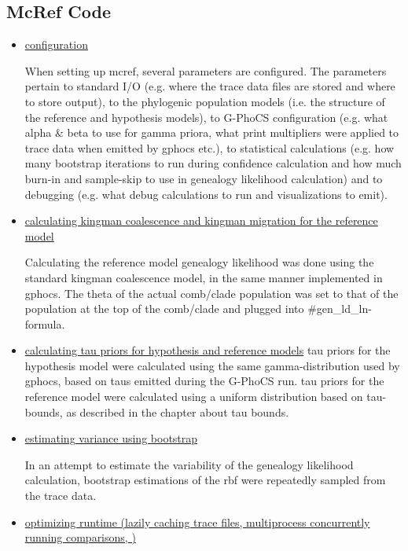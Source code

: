 \documentclass[11pt]{article}
\newcommand{\1}{\mathbbm{1}}
\newcommand{\gp}{G-PhoCS }
\begin{document}
\subsection{McRef Code}

\begin{itemize}
\item \underline{configuration}

When setting up mcref, several parameters are configured. The parameters pertain to standard I/O (e.g. where the trace data files are stored and where to store output), to the phylogenic population models (i.e. the structure of the reference and hypothesis models), to \gp configuration (e.g. what alpha \& beta to use for gamma priora, what print multipliers were applied to trace data when emitted by gphocs etc.), to statistical calculations (e.g. how many bootstrap iterations to run during confidence calculation and how much burn-in and sample-skip to use in genealogy likelihood calculation) and to debugging (e.g. what debug calculations to run and visualizations to emit). 

\item \underline{calculating kingman coalescence and kingman migration for the reference model}

Calculating the reference model genealogy likelihood was done using the standard kingman coalescence model, in the same manner implemented in gphocs. The theta of the actual comb/clade population was set to that of the population at the top of the comb/clade and plugged into \#gen\_ld\_ln-formula. 

\item \underline{calculating tau priors for hypothesis and reference models}
tau priors for the hypothesis model were calculated using the same gamma-distribution used by gphocs, based on taus emitted during the \gp run. tau priors for the reference model were calculated using a uniform distribution based on tau-bounds, as described in the chapter about tau bounds.

\item \underline{estimating variance using bootstrap}

In an attempt to estimate the variability of the genealogy likelihood calculation, bootstrap estimations of the rbf were repeatedly sampled from the trace data. 


\item \underline{optimizing runtime (lazily caching trace files, multiprocess concurrently running comparisons, )}


\end{itemize}
\end{document}
